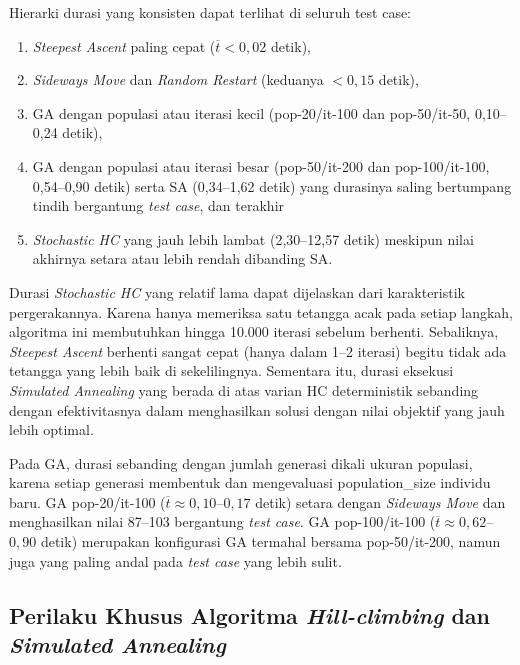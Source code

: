 Hierarki durasi yang konsisten dapat terlihat di seluruh test case: 
\begin{enumerate}
    \item \textit{Steepest Ascent} paling cepat ($\overline{t} < 0{,}02$ detik),
    \item \textit{Sideways Move} dan \textit{Random Restart} (keduanya $< 0{,}15$ detik),
    \item GA dengan populasi atau iterasi kecil (pop-20/it-100 dan pop-50/it-50, 0,10--0,24 detik),
    \item GA dengan populasi atau iterasi besar (pop-50/it-200 dan pop-100/it-100, 0,54--0,90 detik) serta SA (0,34--1,62 detik) yang durasinya saling bertumpang tindih bergantung \textit{test case}, dan terakhir
    \item \textit{Stochastic HC} yang jauh lebih lambat (2,30--12,57 detik) meskipun nilai akhirnya setara atau lebih rendah dibanding SA.
\end{enumerate}

Durasi \textit{Stochastic HC} yang relatif lama dapat dijelaskan dari karakteristik pergerakannya. Karena hanya memeriksa satu tetangga acak pada setiap langkah, algoritma ini membutuhkan hingga 10.000 iterasi sebelum berhenti. Sebaliknya, \textit{Steepest Ascent} berhenti sangat cepat (hanya dalam 1--2 iterasi) begitu tidak ada tetangga yang lebih baik di sekelilingnya. Sementara itu, durasi eksekusi \textit{Simulated Annealing} yang berada di atas varian HC deterministik sebanding dengan efektivitasnya dalam menghasilkan solusi dengan nilai objektif yang jauh lebih optimal.

Pada GA, durasi sebanding dengan jumlah generasi dikali ukuran populasi, karena setiap generasi membentuk dan mengevaluasi population\_size individu baru. GA pop-20/it-100 ($\overline{t} \approx 0{,}10$--$0{,}17$ detik) setara dengan \textit{Sideways Move} dan menghasilkan nilai 87--103 bergantung \textit{test case}. GA pop-100/it-100 ($\overline{t} \approx 0{,}62$--$0{,}90$ detik) merupakan konfigurasi GA termahal bersama pop-50/it-200, namun juga yang paling andal pada \textit{test case} yang lebih sulit.

\subsection{Perilaku Khusus Algoritma \textit{Hill-climbing} dan \textit{Simulated Annealing}}

